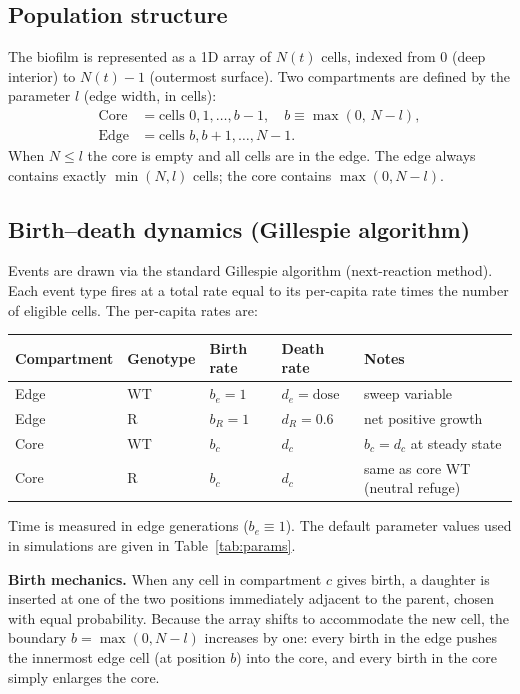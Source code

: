 \documentclass[12pt]{article}
\newcommand{\bEdge}{b_e}
\newcommand{\dEdge}{d_e}
\newcommand{\bCore}{b_c}
\newcommand{\dCore}{d_c}
\begin{document}
\subsection{Population structure}

The biofilm is represented as a 1D array of $N(t)$ cells, indexed from $0$
(deep interior) to $N(t)-1$ (outermost surface). Two compartments are defined
by the parameter $l$ (edge width, in cells):
\begin{align}
    \text{Core} &= \text{cells } 0, 1, \ldots, b-1, \quad b \equiv \max(0,\, N-l), \\
    \text{Edge} &= \text{cells } b, b+1, \ldots, N-1.
\end{align}
When $N \leq l$ the core is empty and all cells are in the edge. The edge
always contains exactly $\min(N, l)$ cells; the core contains $\max(0, N-l)$.

\subsection{Birth--death dynamics (Gillespie algorithm)}

Events are drawn via the standard Gillespie algorithm (next-reaction
method). Each event type fires at a total rate equal to its per-capita rate
times the number of eligible cells. The per-capita rates are:

\begin{center}
\begin{tabular}{lllll}
\toprule
Compartment & Genotype & Birth rate & Death rate & Notes \\
\midrule
Edge  & WT & $\bEdge = 1$ & $\dEdge = \text{dose}$ & sweep variable \\
Edge  & R  & $b_R = 1$    & $d_R = 0.6$             & net positive growth \\
Core  & WT & $\bCore$     & $\dCore$                & $\bCore = \dCore$ at steady state \\
Core  & R  & $\bCore$     & $\dCore$                & same as core WT (neutral refuge) \\
\bottomrule
\end{tabular}
\end{center}

Time is measured in edge generations ($\bEdge \equiv 1$). The default
parameter values used in simulations are given in Table~\ref{tab:params}.

\textbf{Birth mechanics.} When any cell in compartment $c$ gives birth, a
daughter is inserted at one of the two positions immediately adjacent to the
parent, chosen with equal probability. Because the array shifts to accommodate
the new cell, the boundary $b = \max(0, N-l)$ increases by one: every birth
in the edge pushes the innermost edge cell (at position $b$) into the core,
and every birth in the core simply enlarges the core.
\end{document}
